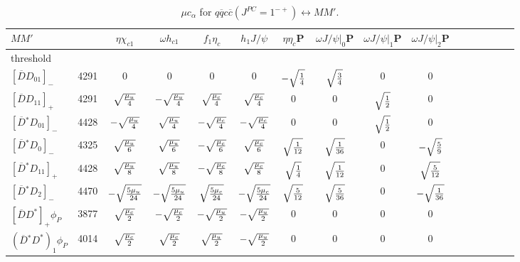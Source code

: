 \documentclass[a4j]{jarticle}
\def\Jpsi{{J\!/\!\psi}{}}
\def\cbar{\overline{{c}}}
\def\qbar{\overline{{q}}}
\def\Dbar{\overline{{D}}{}}
\begin{document}
\begin{table}[htp]
\caption{$\mu c_\alpha$ for $q\qbar c\cbar(J^{PC}=1^{-+})\leftrightarrow MM'$. }
\def\ssz{~${}^1S_0$}
\def\tso{~${}^3S_1$}
\def\spo{~${}^1P_1$}
\def\tpz{~${}^3P_0$}
\def\tpo{~${}^3P_1$}
\def\tpt{~${}^3P_2$}
\def\rtmc{\sqrt{\mu_c}}
\def\rtmu{\sqrt{\mu_u}}
\renewcommand\arraystretch{1.8}
\setlength\tabcolsep{1mm}
\begin{tabular}{l|r|cc|cc|cccccccccc}\hline
$MM'$                    &      & $\eta$$\chi_{c1}$& $\omega$$h_{c1}$&  $f_{1}$$\eta_c$& $h_1$$\Jpsi$ &$\eta$$\eta_c$P&  $\omega$$\Jpsi$$|_0$P &  $\omega$$\Jpsi$$|_1$P&  $\omega$$\Jpsi$$|_2$P\\
\hline
threshold               %
\\
\hline
 $[\Dbar   D_{01}]_-$    & 4291 &  0                      &  0                       &  0                      &  0                       & $-\sqrt{1\over 4}    $& $ \sqrt{3\over 4}    $& 0                    &  0                  \\
 $[\Dbar   D_{11}]_+$    & 4291 & $ \sqrt{\mu_u\over 4}  $& $ -\sqrt{\mu_u\over 4}  $& $ \sqrt{\mu_c\over 4}  $& $  \sqrt{\mu_c\over 4}  $&  0                    &  0                    & $ \sqrt{1\over 2}   $&  0                  \\
 $[\Dbar^* D_{01}]_-$    & 4428 & $-\sqrt{\mu_u\over 4}  $& $  \sqrt{\mu_u\over 4}  $& $-\sqrt{\mu_c\over 4}  $& $ -\sqrt{\mu_c\over 4}  $&  0                    &  0                    & $ \sqrt{1\over 2}   $&  0                  \\
 $[\Dbar^* D_{0} ]_-$    & 4325 & $ \sqrt{\mu_u\over 6}  $& $  \sqrt{\mu_u\over 6}  $& $-\sqrt{\mu_c\over 6}  $& $  \sqrt{\mu_c\over 6}  $& $ \sqrt{1\over 12}   $& $ \sqrt{1\over 36}   $& 0                    & $-\sqrt{5\over 9}   $\\
 $[\Dbar^* D_{11}]_+$    & 4428 & $ \sqrt{\mu_u\over 8}  $& $  \sqrt{\mu_u\over 8}  $& $-\sqrt{\mu_c\over 8}  $& $  \sqrt{\mu_c\over 8}  $& $ \sqrt{1\over 4}    $& $ \sqrt{1\over 12}   $& 0                    & $ \sqrt{5\over 12}  $\\
 $[\Dbar^* D_{2} ]_-$    & 4470 & $-\sqrt{5\mu_u\over 24}$& $ -\sqrt{5\mu_u\over 24}$& $ \sqrt{5\mu_c\over 24}$& $ -\sqrt{5\mu_c\over 24}$& $ \sqrt{5\over 12}   $& $ \sqrt{5\over 36}   $& 0                    & $-\sqrt{1\over 36}  $\\\hline%
%
 $[\Dbar   D^*]_+\phi_P$ & 3877 & $ \sqrt{\mu_c\over 2}  $& $-\sqrt{\mu_c\over 2}   $& $-\sqrt{\mu_u\over 2}  $& $-\sqrt{\mu_u\over 2}   $&  0&  0 &  0&  0 \\
 $(\Dbar^* D^*)_1\phi_P$ & 4014 & $ \sqrt{\mu_c\over 2}  $& $ \sqrt{\mu_c\over 2}   $& $ \sqrt{\mu_u\over 2}  $& $-\sqrt{\mu_u\over 2}   $&  0&  0 &  0&  0 
\\ \hline 
\end{tabular}
\label{tbl:3a}
\end{table}%
\end{document}
